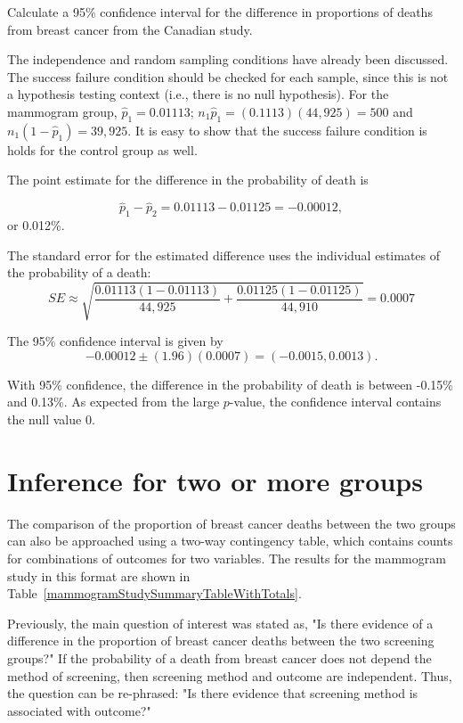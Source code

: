 \begin{example}{Calculate a 95\% confidence interval for the difference in proportions of deaths from breast cancer from the Canadian study.}

\label{mammogramExConfInt}

The independence and random sampling conditions have already been discussed.  The success failure condition should be checked for each sample, since this is not a hypothesis testing context (i.e., there is no null hypothesis). For the mammogram group, $\hat{p}_1 = 0.01113$; $n_1 \hat{p}_1 = (0.1113)(44,925) = 500$ and $n_1 (1 - \hat{p}_1) = 39,925.$ It is easy to show that the success failure condition is holds for the control group as well.

The point estimate for the difference in the probability of death is

$$\hat{p}_{1} - \hat{p}_{2} = 0.01113 - 0.01125 = -0.00012,$$ or 0.012\%.

The standard error for the estimated difference uses the individual estimates of the probability of a death:
$$SE \approx \sqrt{\frac{0.01113(1-0.01113)}{44,925} + \frac{0.01125(1-0.01125)}{44,910}} = 0.0007 $$

The 95\% confidence interval is given by 
$$ -0.00012 \pm (1.96) (0.0007) = (-0.0015, 0.0013).$$

With 95\% confidence, the difference in the probability of death is between -0.15\% and 0.13\%. As expected from the large $p$-value, the confidence interval contains the null value 0.

\end{example}





\section{Inference for two or more groups}
\label{twoWayTablesAndChiSquare}

The comparison of the proportion of breast cancer deaths between the two groups can also be approached using a two-way contingency table, which contains counts for combinations of outcomes for two variables. The results for the mammogram study in this format are shown in Table~\ref{mammogramStudySummaryTableWithTotals}.

Previously, the main question of interest was stated as, "Is there evidence of a difference in the proportion of breast cancer deaths between the two screening groups?" If the probability of a death from breast cancer does not depend the method of screening, then screening method and outcome are independent. Thus, the question can be re-phrased: "Is there evidence that screening method is associated with outcome?"

